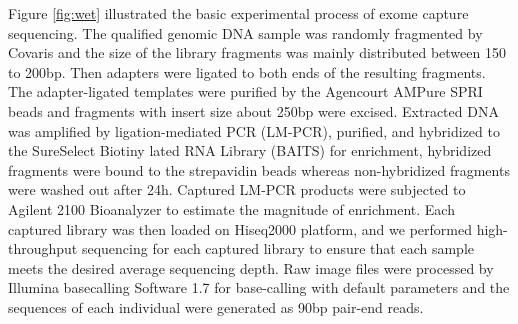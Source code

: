 \documentclass[11pt]{article}
\begin{document}
Figure \ref{fig:wet} illustrated the basic experimental process of exome capture sequencing. The qualified genomic DNA sample was randomly fragmented by Covaris and the size of the library fragments was mainly distributed between 150 to 200bp. Then adapters were ligated to both ends of the resulting fragments. The adapter-ligated templates were purified by the Agencourt AMPure SPRI beads and fragments with insert size about 250bp were excised. Extracted DNA was amplified by ligation-mediated PCR (LM-PCR), purified, and hybridized to the SureSelect Biotiny lated RNA Library (BAITS) for enrichment, hybridized fragments were bound to the strepavidin beads whereas non-hybridized fragments were washed out after 24h. Captured LM-PCR products were subjected to Agilent 2100 Bioanalyzer to estimate the magnitude of enrichment. Each captured library was then loaded on Hiseq2000 platform, and we performed high-throughput sequencing for each captured library to ensure that each sample meets the desired average sequencing depth. Raw image files were processed by Illumina basecalling Software 1.7 for base-calling with default parameters and the sequences of each individual were generated as 90bp pair-end reads.
\end{document}
